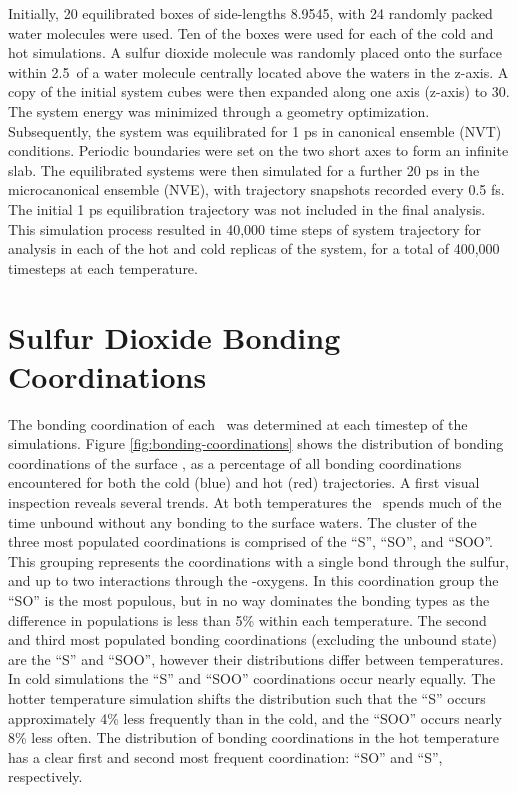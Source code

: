 \documentclass{article}
\begin{document}
Initially, 20 equilibrated boxes of side-lengths 8.9545\angs, with 24 randomly packed water molecules were used. Ten of the boxes were used for each of the cold and hot simulations. A sulfur dioxide molecule was randomly placed onto the surface within 2.5\angs~of a water molecule centrally located above the waters in the z-axis. A copy of the initial system cubes were then expanded along one axis (z-axis) to 30\angs. The system energy was minimized through a geometry optimization. Subsequently, the system was equilibrated for 1 ps in canonical ensemble (NVT) conditions. Periodic boundaries were set on the two short axes to form an infinite slab. The equilibrated systems were then simulated for a further 20 ps in the microcanonical ensemble (NVE), with trajectory snapshots recorded every 0.5 fs. The initial 1 ps equilibration trajectory was not included in the final analysis. This simulation process resulted in 40,000 time steps of system trajectory for analysis in each of the hot and cold replicas of the system, for a total of 400,000 timesteps at each temperature.

\section {Sulfur Dioxide Bonding Coordinations}

The bonding coordination of each \suldiox~was determined at each timestep of the simulations. Figure \ref{fig:bonding-coordinations} shows the distribution of bonding coordinations of the surface \suldiox, as a percentage of all bonding coordinations encountered for both the cold (blue) and hot (red) trajectories. A first visual inspection reveals several trends. At both temperatures the \suldiox~spends much of the time unbound without any bonding to the surface waters. The cluster of the three most populated coordinations is comprised of the ``S'', ``SO'', and ``SOO''. This grouping represents the coordinations with a single bond through the sulfur, and up to two interactions through the \suldiox-oxygens. In this coordination group the ``SO'' is the most populous, but in no way dominates the bonding types as the difference in populations is less than 5\% within each temperature. The second and third most populated bonding coordinations (excluding the unbound state) are the ``S'' and ``SOO'', however their distributions differ between temperatures. In cold simulations the ``S'' and ``SOO'' coordinations occur nearly equally. The hotter temperature simulation shifts the distribution such that the ``S'' occurs approximately 4\% less frequently than in the cold, and the ``SOO'' occurs nearly 8\% less often. The distribution of bonding coordinations in the hot temperature has a clear first and second most frequent coordination: ``SO'' and ``S'', respectively. 
\end{document}

